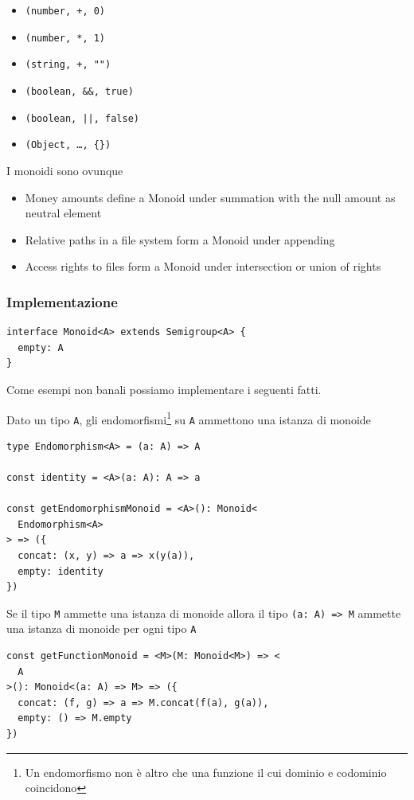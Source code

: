 \documentclass[12pt]{article}
\begin{document}
\begin{itemize}
  \item \texttt{(number, +, 0)}
  \item \texttt{(number, *, 1)}
  \item \texttt{(string, +, "")}
  \item \texttt{(boolean, \&\&, true)}
  \item \texttt{(boolean, ||, false)}
  \item \texttt{(Object, \ldots, \{\})}
\end{itemize}

I monoidi sono ovunque

\begin{itemize}
  \item Money amounts define a Monoid under summation with the null amount as neutral element
  \item Relative paths in a file system form a Monoid under appending
  \item Access rights to files form a Monoid under intersection or union of rights
\end{itemize}

\subsubsection{Implementazione}

\begin{verbatim}
interface Monoid<A> extends Semigroup<A> {
  empty: A
}
\end{verbatim}

Come esempi non banali possiamo implementare i seguenti fatti.

Dato un tipo \texttt{A}, gli endomorfismi\footnote{Un endomorfismo non è altro che una funzione il cui dominio e codominio coincidono}
su \texttt{A} ammettono una istanza di monoide

\begin{verbatim}
type Endomorphism<A> = (a: A) => A

const identity = <A>(a: A): A => a

const getEndomorphismMonoid = <A>(): Monoid<
  Endomorphism<A>
> => ({
  concat: (x, y) => a => x(y(a)),
  empty: identity
})
\end{verbatim}

Se il tipo \texttt{M} ammette una istanza di monoide allora il tipo \texttt{(a: A) => M} ammette una istanza di monoide per ogni tipo \texttt{A}

\begin{verbatim}
const getFunctionMonoid = <M>(M: Monoid<M>) => <
  A
>(): Monoid<(a: A) => M> => ({
  concat: (f, g) => a => M.concat(f(a), g(a)),
  empty: () => M.empty
})
\end{verbatim}
\end{document}
